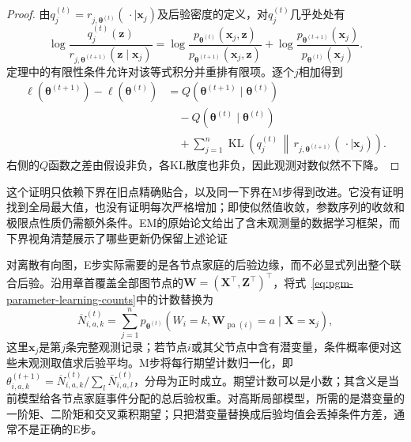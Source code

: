 \begin{proof}
  由$q_j^{(t)}=r_{j,\bm{\theta}^{(t)}}(\,\cdot\mid\bm{x}_j)$及后验密度的定义，对$q_j^{(t)}$几乎处处有
  \[
    \log\frac{q_j^{(t)}(\bm{z})}
                  {r_{j,\bm{\theta}^{(t+1)}}(\bm{z}\mid\bm{x}_j)}
    =
    \log\frac{p_{\bm{\theta}^{(t)}}(\bm{x}_j,\bm{z})}
                  {p_{\bm{\theta}^{(t+1)}}(\bm{x}_j,\bm{z})}
    +\log\frac{p_{\bm{\theta}^{(t+1)}}(\bm{x}_j)}
                   {p_{\bm{\theta}^{(t)}}(\bm{x}_j)}.
  \]
  定理中的有限性条件允许对该等式积分并重排有限项。逐个$j$相加得到
  \[
    \begin{aligned}
      \ell(\bm{\theta}^{(t+1)})-\ell(\bm{\theta}^{(t)})
      &=
      Q(\bm{\theta}^{(t+1)}\mid\bm{\theta}^{(t)})\\
      &\quad-Q(\bm{\theta}^{(t)}\mid\bm{\theta}^{(t)})\\
      &\quad+\sum_{j=1}^n
        \operatorname{KL}\!\left(
          q_j^{(t)}\,\middle\|\,
          r_{j,\bm{\theta}^{(t+1)}}(\,\cdot\mid\bm{x}_j)
        \right).
    \end{aligned}
  \]
  右侧的$Q$函数之差由假设非负，各KL散度也非负，因此观测对数似然不下降。
\end{proof}

这个证明只依赖下界在旧点精确贴合，以及同一下界在M步得到改进。它没有证明找到全局最大值，也没有证明每次严格增加；即使似然值收敛，参数序列的收敛和极限点性质仍需额外条件。EM的原始论文给出了含未观测量的数据学习框架，而下界视角清楚展示了哪些更新仍保留上述论证

对离散有向图，E步实际需要的是各节点家庭的后验边缘，而不必显式列出整个联合后验。沿用章首覆盖全部图节点的$\bm{W}=(\bm{X}^\top,\bm{Z}^\top)^\top$，将式~\eqref{eq:pgm-parameter-learning-counts}中的计数替换为
\begin{equation}
  \overline N_{i,a,k}^{(t)}
    =\sum_{j=1}^n
      p_{\bm{\theta}^{(t)}}\!
        \left(W_i=k,\bm{W}_{\operatorname{pa}(i)}=a
                    \mid\bm{X}=\bm{x}_j\right),
  \label{eq:pgm-parameter-learning-expected-counts}
\end{equation}
这里$\bm{x}_j$是第$j$条完整观测记录；若节点$i$或其父节点中含有潜变量，条件概率便对这些未观测取值求后验平均。M步将每行期望计数归一化，即$\theta_{i,a,k}^{(t+1)}=\overline N_{i,a,k}^{(t)}/\sum_l\overline N_{i,a,l}^{(t)}$，分母为正时成立。期望计数可以是小数；其含义是当前模型给各节点家庭事件分配的总后验权重。对高斯局部模型，所需的是潜变量的一阶矩、二阶矩和交叉乘积期望；只把潜变量替换成后验均值会丢掉条件方差，通常不是正确的E步。


